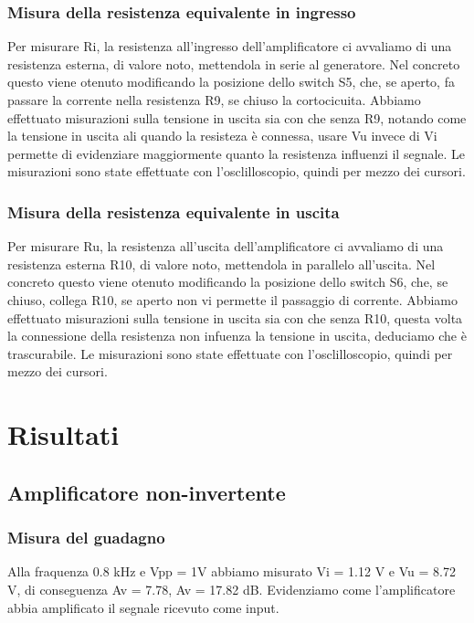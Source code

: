 \documentclass[a4paper]{article}
\begin{document}
			\subsubsection{Misura della resistenza equivalente in ingresso}	
				Per misurare Ri, la resistenza all'ingresso dell'amplificatore ci avvaliamo di una resistenza esterna, di valore noto, mettendola in serie al generatore.
				Nel concreto questo viene otenuto modificando la  posizione dello switch S5, che, se aperto, fa passare la corrente nella resistenza R9, se chiuso la cortocicuita.
				Abbiamo effettuato misurazioni sulla tensione in uscita sia con che senza R9, notando come la tensione in uscita ali quando la resisteza è connessa, usare Vu invece di Vi permette di evidenziare maggiormente quanto la resistenza influenzi il segnale. %
				Le misurazioni sono state effettuate con l'osclilloscopio, quindi per mezzo dei cursori.
			\subsubsection{Misura della resistenza equivalente in uscita}	
				Per misurare Ru, la resistenza all'uscita dell'amplificatore ci avvaliamo di una resistenza esterna R10, di valore noto, mettendola in parallelo all'uscita.
				Nel concreto questo viene otenuto modificando la  posizione dello switch S6, che, se chiuso, collega R10, se aperto non vi permette il passaggio di corrente.
				Abbiamo effettuato misurazioni sulla tensione in uscita sia con che senza R10, questa volta la connessione della resistenza non infuenza la tensione in uscita, deduciamo che è trascurabile. %
				Le misurazioni sono state effettuate con l'osclilloscopio, quindi per mezzo dei cursori.
	\section{Risultati}
		\subsection{Amplificatore non-invertente}
			\subsubsection{Misura del guadagno}
				Alla fraquenza 0.8 kHz e Vpp = 1V abbiamo misurato Vi = 1.12 V e Vu = 8.72 V, di conseguenza Av = 7.78, Av = 17.82 dB. 
				Evidenziamo come l'amplificatore abbia amplificato il segnale ricevuto come input.
\end{document}
